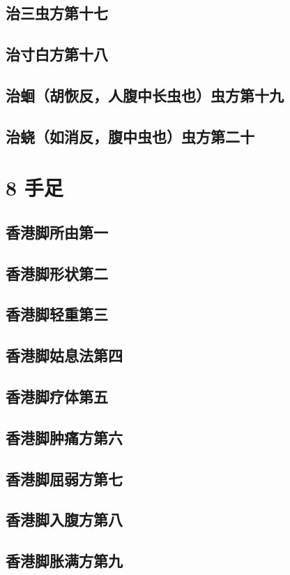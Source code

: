 \documentclass[a4paper,12pt,UTF8,twoside]{ctexbook}
\begin{document}
\chapter{治三虫方第十七}
\chapter{治寸白方第十八}
\chapter{治蛔（胡恢反，人腹中长虫也）虫方第十九}
\chapter{治蛲（如消反，腹中虫也）虫方第二十}

\part{8 手足}
\chapter{香港脚所由第一}
\chapter{香港脚形状第二}
\chapter{香港脚轻重第三}
\chapter{香港脚姑息法第四}
\chapter{香港脚疗体第五}
\chapter{香港脚肿痛方第六}
\chapter{香港脚屈弱方第七}
\chapter{香港脚入腹方第八}
\chapter{香港脚胀满方第九}
\end{document}
